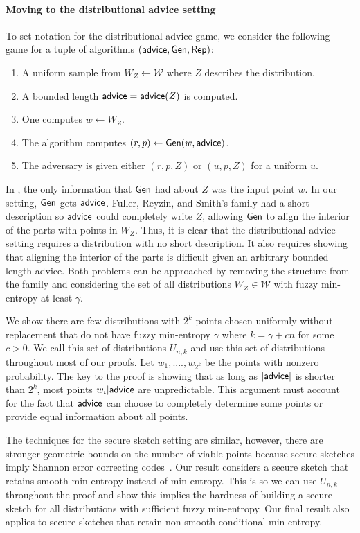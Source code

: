 \paragraph{Moving to the distributional advice setting}
To set notation for the distributional advice game, we consider the following game for a tuple of algorithms $({\mathsf{advice}}, {\mathsf{Gen}}, {\mathsf{Rep}})$:
\begin{enumerate}
\itemsep0em
\item A uniform sample from $W_Z \leftarrow \mathcal{W}$ where $Z$ describes the distribution. 
\item A bounded length ${\mathsf{advice}} = {\mathsf{advice}}(Z)$ is computed.
\item One computes $w\leftarrow W_Z$.
\item The algorithm computes $(r, p)\leftarrow {\ensuremath{\mathsf{Gen}}}(w, {\mathsf{advice}})$.
\item The adversary is given either $(r, p, Z)$ or $(u, p, Z)$ for a uniform $u$. 
\end{enumerate}

In \cite{fuller2020fuzzy}, the only information that ${\mathsf{Gen}}$ had about $Z$ was the input point $w$.  In our setting, ${\mathsf{Gen}}$ gets ${\mathsf{advice}}$.  Fuller, Reyzin, and Smith's family had a short description so ${\mathsf{advice}}$ could completely write $Z$, allowing ${\mathsf{Gen}}$ to align the interior of the parts with points in $W_Z$.  Thus, it is clear that the distributional advice setting requires a distribution with no short description.  It also requires showing that aligning the interior of the parts is difficult given an arbitrary bounded length advice.  Both problems can be approached by removing the structure from the family and considering the set of all distributions $W_Z\in\mathcal{W}$ with fuzzy min-entropy at least $\gamma$. 

We show there are few distributions with $2^k$ points chosen uniformly without replacement that do not have fuzzy min-entropy $\gamma$ where $k = \gamma +cn$ for some $c>0$.  We call this set of distributions $U_{n,k}$ and use this set of distributions throughout most of our proofs. Let $w_1,...., w_{2^k}$ be the points with nonzero probability.  The key to the proof is showing that as long as $|{\mathsf{advice}}|$ is shorter than $2^k$, most points $w_i | {\mathsf{advice}}$ are unpredictable.  This argument must account for the fact that ${\mathsf{advice}}$ can choose to completely determine some points or provide equal information about all points. 

The techniques for the secure sketch setting are similar, however, there are stronger geometric bounds on the number of viable points because secure sketches imply Shannon error correcting codes~\cite{dodis2008fuzzy,fuller2020computational}.  Our result considers a secure sketch that retains smooth min-entropy instead of min-entropy.  This is so we can use $U_{n,k}$ throughout the proof and show this implies the hardness of building a secure sketch for all distributions with sufficient fuzzy min-entropy.  Our final result also applies to secure sketches that retain non-smooth conditional min-entropy.

